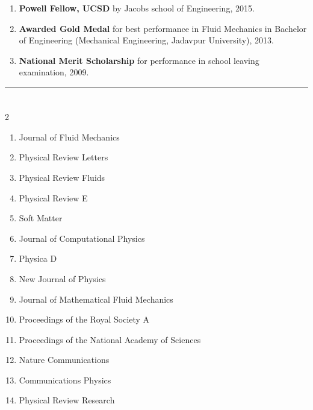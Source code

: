 \documentclass[10pt]{res} %
\begin{document}
\begin{resume}
\begin{enumerate}
	\item \textbf{Powell Fellow, UCSD} by Jacobs school of Engineering, 2015.
	
	
	\item \textbf{Awarded Gold Medal} for best performance in Fluid Mechanics in Bachelor of Engineering (Mechanical Engineering, Jadavpur University), 2013.
	
	\item \textbf{National Merit Scholarship} for performance in school leaving examination, 2009.
\end{enumerate}


\vspace*{-2mm}
\noindent\rule{\textwidth}{0.6pt}
\vspace*{-10mm}
\section{}
\vspace*{3mm}


\begin{multicols}{2}
	\begin{enumerate}
		\item Journal of Fluid Mechanics
		\item Physical Review Letters
		\item Physical Review Fluids
		\item Physical Review E
		\item Soft Matter
		\item Journal of Computational Physics
		\item Physica D
		\item New Journal of Physics
		\item Journal of Mathematical Fluid Mechanics
		\item Proceedings of the Royal Society A
		\item Proceedings of the National Academy of Sciences
		\item Nature Communications
		\item Communications Physics
		\item Physical Review Research
	\end{enumerate}
\end{multicols}


\end{resume}
\end{document}

